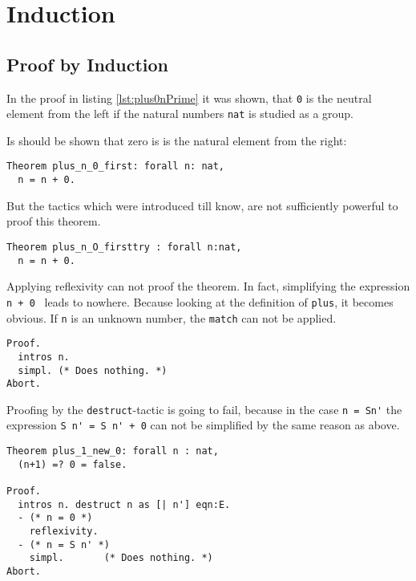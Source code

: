 \section{Induction}

\subsection{Proof by Induction}
In the proof in listing \ref{lst:plus0nPrime} it was shown, 
that \lstinline!0! is the neutral element from the left if the natural numbers \lstinline!nat! is studied as a group. 

Is should be shown that zero is is the natural element from the right:
\begin{lstlisting}[caption = \lstinline!plus_n_0_first!, label= lst:plus_n_0_first]
Theorem plus_n_0_first: forall n: nat,
  n = n + 0.  
\end{lstlisting}

But the tactics which were introduced till know, are not sufficiently powerful to proof this theorem.

\begin{lstlisting}[caption = \lstinline!plus_n_O_firsttry!, label=lst:plus_n_0_firsttry] 
Theorem plus_n_O_firsttry : forall n:nat,
  n = n + 0.
\end{lstlisting}

Applying reflexivity can not proof the theorem. In fact, simplifying the expression \lstinline!n + 0 ! leads to nowhere.
Because looking at the definition of \lstinline!plus!, it becomes obvious.
If \lstinline!n! is an unknown number, the  \lstinline!match! can not be applied.
  
\begin{lstlisting}[caption= \lstinline!Proof! of \lstinline!plus_n_0_firsttry!, label = lst:proof_of_plus_n_0_firsttry]
Proof.
  intros n.
  simpl. (* Does nothing. *)
Abort.
\end{lstlisting}

Proofing by the \lstinline!destruct!-tactic is going to fail, because in the case \lstinline!n = Sn'! the expression \lstinline!S n' = S n' + 0! can not be simplified by the same reason as above.
\begin{lstlisting}[caption = \lstinline!plus_1_new_0!, label = lst:Theorem_plus_1_new_0]
Theorem plus_1_new_0: forall n : nat,
  (n+1) =? 0 = false. 
 
Proof.
  intros n. destruct n as [| n'] eqn:E.
  - (* n = 0 *)
    reflexivity. 
  - (* n = S n' *)
    simpl.       (* Does nothing. *)
Abort.
\end{lstlisting}

